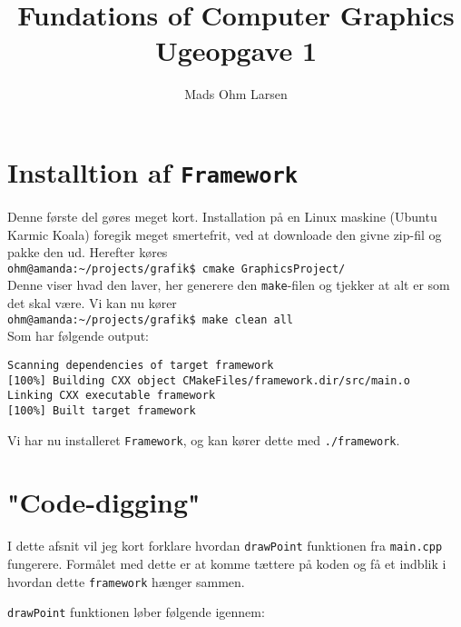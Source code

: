 \documentclass[a4paper, 10pt]{article}
\title{Fundations of Computer Graphics\\ Ugeopgave 1}
\author{Mads Ohm Larsen}
\begin{document}
\maketitle

\section{Installtion af \texttt{Framework}}
Denne første del gøres meget kort.
Installation på en Linux maskine (Ubuntu Karmic Koala) foregik meget smertefrit, ved at downloade den givne zip-fil og pakke den ud.
Herefter køres\\ 

\noindent \texttt{ohm@amanda:\textasciitilde/projects/grafik\$ cmake GraphicsProject/}\\

\noindent Denne viser hvad den laver, her generere den \texttt{make}-filen og tjekker at alt er som det skal være.
Vi kan nu kører\\

\noindent \texttt{ohm@amanda:\textasciitilde/projects/grafik\$ make clean all}\\

\noindent Som har følgende output:
\begin{verbatim}
Scanning dependencies of target framework
[100%] Building CXX object CMakeFiles/framework.dir/src/main.o
Linking CXX executable framework
[100%] Built target framework
\end{verbatim}

Vi har nu installeret \texttt{Framework}, og kan kører dette med \texttt{./framework}.

\section{"Code-digging"}
I dette afsnit vil jeg kort forklare hvordan \texttt{drawPoint} funktionen fra \texttt{main.cpp} fungerere.
Formålet med dette er at komme tættere på koden og få et indblik i hvordan dette \texttt{framework} hænger sammen.

\texttt{drawPoint} funktionen løber følgende igennem:
\end{document}
